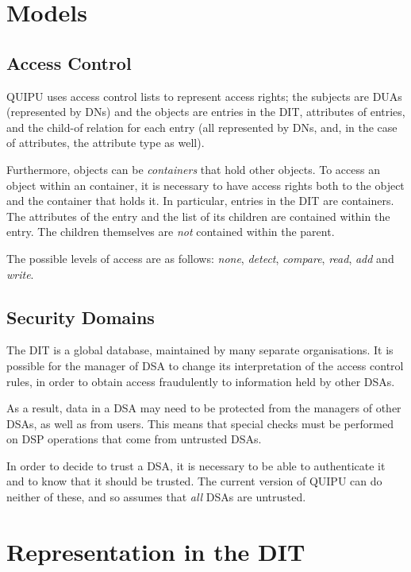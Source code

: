 
\section{Models}

\subsection{Access Control}

QUIPU uses access control lists to represent access rights; the subjects
are DUAs (represented by DNs) and the objects are entries in the DIT,
attributes of entries, and the child-of relation for each entry (all represented
by DNs, and, in the case of attributes, the attribute type as well).

Furthermore, objects can be {\em containers} that hold other objects. To access
an object within an container, it is necessary to have access rights both to
the object and the container that holds it. In particular, entries in the DIT
are containers. The attributes of the entry and the list of its children
are contained within the entry. The children themselves are {\em not} contained
within the parent.

The possible levels of access are as follows: {\em none}, {\em detect}, 
{\em compare}, {\em read}, {\em add} and {\em write}.

\subsection{Security Domains}

The DIT is a global database, maintained by many separate organisations.  
It is possible for the manager of DSA to change its interpretation of the 
access control rules, in order to  obtain access fraudulently to information
held by other DSAs. 

As a result, data in a DSA may need to be protected from the managers of other
DSAs, as well as from users. This means that special checks must be performed
on DSP operations that come from untrusted DSAs.

In order to decide to trust a DSA, it is necessary to be able to authenticate it
and to know that it should be trusted. The current version of QUIPU 
can do neither of these, and
so assumes that {\em all} DSAs are untrusted.


\section{Representation in the DIT}

